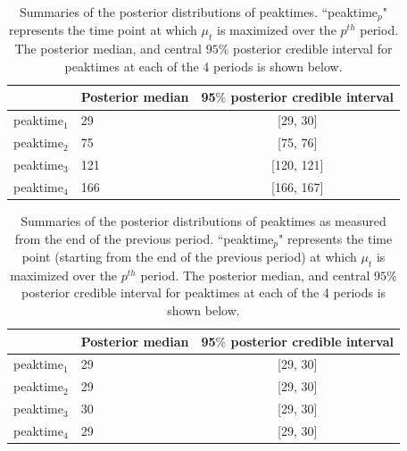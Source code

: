 \documentclass[12pt, a4paper]{article}
\begin{document}
\begin{table}[H]
\centering
\caption{\small Summaries of the posterior distributions of peaktimes. ``peaktime$_{p}$" represents the time point at which $\mu_{t}$ is maximized over the $p^{th}$ period. The posterior median, and central $95\%$ posterior credible interval for peaktimes at each of the 4 periods is shown below.}
  \label{}
  \begin{tabu} to \textwidth {Xlc}
  \toprule
  & Posterior median  & 95$\%$ posterior credible interval \\ \midrule
  peaktime$_{1}$ & 29                & [29, 30]       \\
  peaktime$_{2}$ & 75                & [75, 76]       \\
  peaktime$_{3}$ & 121               & [120, 121]      \\
  peaktime$_{4}$ & 166               & [166, 167]      \\ \bottomrule
  \end{tabu}
  \end{table}
  
  \begin{table}[H]
  \centering
  \caption{\small Summaries of the posterior distributions of peaktimes as measured from the end of the previous period. ``peaktime$_{p}$" represents the time point (starting from the end of the previous period) at which $\mu_{t}$ is maximized over the $p^{th}$ period. The posterior median, and central $95\%$ posterior credible interval for peaktimes at each of the 4 periods is shown below.}
\label{}
\begin{tabu} to \textwidth {Xlc}
\toprule
& Posterior median  & 95$\%$ posterior credible interval \\ \midrule
peaktime$_{1}$ & 29              & [29, 30]       \\
peaktime$_{2}$ & 29              & [29, 30]       \\
peaktime$_{3}$ & 30              & [29, 30]      \\
peaktime$_{4}$ & 29              & [29, 30]      \\ \bottomrule
\end{tabu}
\end{table}
\end{document}
